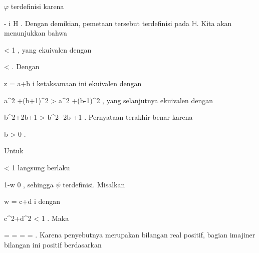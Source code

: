 $\varphi$ terdefinisi karena

\mavergleichskette
{\vergleichskette
{ - { \mathrm i}
}
{ \notin }{ {\mathbb H}
}
{  }{
}
{    }{
}
{   }{
}
}
{}{}{.}
Dengan demikian, pemetaan tersebut terdefinisi pada ${\mathbb H}$. Kita akan menunjukkan bahwa

\mavergleichskettedisp
{\vergleichskette
{ 
}
{ <} { 1
}
{ } {
}
{ } {
}
{ } {
}
}
{}{}{,}
yang ekuivalen dengan

\mavergleichskettedisp
{\vergleichskette
{ 
}
{ <} { 
}
{ } {
}
{ } {
}
{ } {
}
}
{}{}{.}
Dengan

\mavergleichskette
{\vergleichskette
{z
}
{ = }{ a+b { \mathrm i}
}
{  }{
}
{    }{
}
{   }{
}
}
{}{}{}
ketaksamaan ini ekuivalen dengan

\mavergleichskettedisp
{\vergleichskette
{ a^2 +(b+1)^2
}
{ >} { a^2 +(b-1)^2
}
{ } {
}
{ } {
}
{ } {
}
}
{}{}{,}
yang selanjutnya ekuivalen dengan

\mavergleichskettedisp
{\vergleichskette
{ b^2+2b+1
}
{ >} { b^2 -2b +1
}
{ } {
}
{ } {
}
{ } {
}
}
{}{}{.}
Pernyataan terakhir benar karena

\mavergleichskette
{\vergleichskette
{ b
}
{ > }{ 0
}
{  }{
}
{    }{
}
{   }{
}
}
{}{}{.}

Untuk

\mavergleichskette
{\vergleichskette
{ 
}
{ < }{ 1
}
{  }{
}
{    }{
}
{   }{
}
}
{}{}{}
langsung berlaku

\mavergleichskette
{\vergleichskette
{ 1-w
}
{ \neq }{ 0
}
{  }{
}
{    }{
}
{   }{
}
}
{}{}{,}
sehingga $\psi$ terdefinisi. Misalkan

\mavergleichskette
{\vergleichskette
{ w
}
{ = }{ c+d  { \mathrm i}
}
{  }{
}
{    }{
}
{   }{
}
}
{}{}{}
dengan

\mavergleichskette
{\vergleichskette
{ c^2+d^2
}
{ < }{ 1
}
{  }{
}
{    }{
}
{   }{
}
}
{}{}{.}
Maka

\mavergleichskettealignhandlinks
{\vergleichskettealignhandlinks
{ {  }
}
{ =} { {  }
}
{ =} { {  }
}
{ =} { {  } 
}
{ =} { {  }
}
}
{}
{}{.}
Karena penyebutnya merupakan bilangan real positif, bagian imajiner bilangan ini positif berdasarkan

